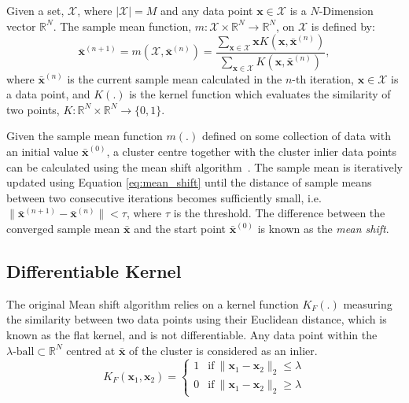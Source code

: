\documentclass[letterpaper, 11pt]{IEEEtran}
\begin{document}
Given a set, $\mathcal X$,
where $|\mathcal{X}|=M$ and any data point $\mathbf x\in\mathcal{X}$ is a $N$-Dimension vector $\mathbb{R}^N$.
The sample mean function, $m:\mathcal{X} \times \mathbb R^{N} \rightarrow \mathbb R^N$, on $\mathcal X$  is defined by:
    \begin{equation}\label{eq:mean_shift}
        \bar {\mathbf x}^{(n+1)} = m(\mathcal{X}, \bar {\mathbf x}^{(n)}) = \frac{\sum_{\mathbf x \in \mathcal X} \mathbf x K(\mathbf x, \bar {\mathbf x}^{(n)}) }{\sum_{\mathbf x \in \mathcal X} K(\mathbf x, \bar{\mathbf x}^{(n)})},
    \end{equation}
where $\bar{\mathbf x}^{(n)}$ is the current sample mean calculated in the $n$-th iteration, $\mathbf x \in \mathcal X$ is a data point, and $K(.)$ is the kernel function which evaluates the similarity of two points, $K:\mathbb R^N \times \mathbb R^{N}\rightarrow \{0,1\}$. 

Given the sample mean function $m(.)$ defined on some collection of data with an initial value $\bar{\mathbf{x}}^{(0)}$, a cluster centre together with the cluster inlier data points can be calculated using the mean shift algorithm~\cite{Fukunaga1975}. The sample mean is iteratively updated using Equation \ref{eq:mean_shift} until the distance of sample means between two consecutive iterations becomes sufficiently small, i.e. $\|\bar{\mathbf x}^{(n+1)} - \bar{\mathbf x}^{(n)} \| < \tau $, where $\tau$ is the threshold. The difference between the converged sample mean $\bar{\mathbf x}$ and the start point $\bar{\mathbf x}^{(0)}$ is known as the {\it mean shift}. 


\subsection{Differentiable Kernel}\label{MS_diff_kernel}

The original Mean shift algorithm relies on a kernel function $K_F(.)$ measuring the similarity between two data points using their Euclidean distance, which is known as the flat kernel, and is not differentiable. Any data point within the $\lambda\text{-ball} \subset \mathbb R^N$ centred at $\bar{\mathbf{x}}$ of the cluster is considered as an inlier.
    \begin{equation}
        K_F(\mathbf x_1, \mathbf x_2)=
        \begin{cases}
          1 & \text{if}\ \|\mathbf x_1 - \mathbf x_2\|_2 \leqslant \lambda \\
          0 & \text{if}\ \|\mathbf x_1 - \mathbf x_2\|_2 \geqslant \lambda
        \end{cases}
    \end{equation}
\end{document}
